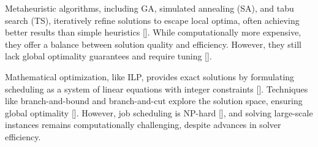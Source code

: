 \documentclass[12pt]{article}
\begin{document}
Metaheuristic algorithms, including GA, simulated annealing (SA), and tabu search (TS), iteratively refine solutions to escape local optima, often achieving better results than simple heuristics []. While computationally more expensive, they offer a balance between solution quality and efficiency. However, they still lack global optimality guarantees and require tuning [].

Mathematical optimization, like ILP, provides exact solutions by formulating scheduling as a system of linear equations with integer constraints []. Techniques like branch-and-bound and branch-and-cut explore the solution space, ensuring global optimality []. However, job scheduling is NP-hard [], and solving large-scale instances remains computationally challenging, despite advances in solver efficiency.







\end{document}
